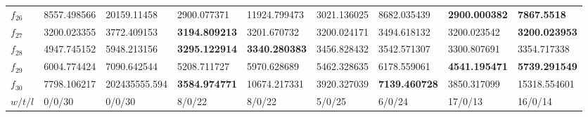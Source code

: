 \begin{table*}[h!]
\begin{tabular}{|p{0.8cm}|p{1.6cm}|p{1.6cm}|p{1.6cm}|p{1.6cm}|p{1.6cm}|p{1.6cm}|p{1.6cm}|p{1.6cm}|}
$f_{26}$  & 8557.498566 & 20159.11458 & 2900.077371 & 11924.799473 & 3021.136025 & 8682.035439 & \textbf{2900.000382} & \textbf{7867.5518} \\ 
$f_{27}$  & 3200.023355 & 3772.409153 & \textbf{3194.809213} & 3201.670732 & 3200.024171 & 3494.618132 & 3200.023542 & \textbf{3200.023953} \\ 
$f_{28}$  & 4947.745152 & 5948.213156 & \textbf{3295.122914} & \textbf{3340.280383} & 3456.828432 & 3542.571307 & 3300.807691 & 3354.717338 \\ 
$f_{29}$  & 6004.774424 & 7090.642544 & 5208.711727 & 5970.628689 & 5462.328635 & 6178.559061 & \textbf{4541.195471} & \textbf{5739.291549} \\ 
$f_{30}$  & 7798.106217 & 202435555.594 & \textbf{3584.974771} & 10674.217331 & 3920.327039 & \textbf{7139.460728} & 3850.317099 & 15318.554601 \\ 
\hline
$w/t/l$  & 0/0/30 & 0/0/30 & 8/0/22 & 8/0/22 & 5/0/25 & 6/0/24 & 17/0/13 & 16/0/14 \\
\hline

 \end{tabular}
\end{table*}
\endgroup
